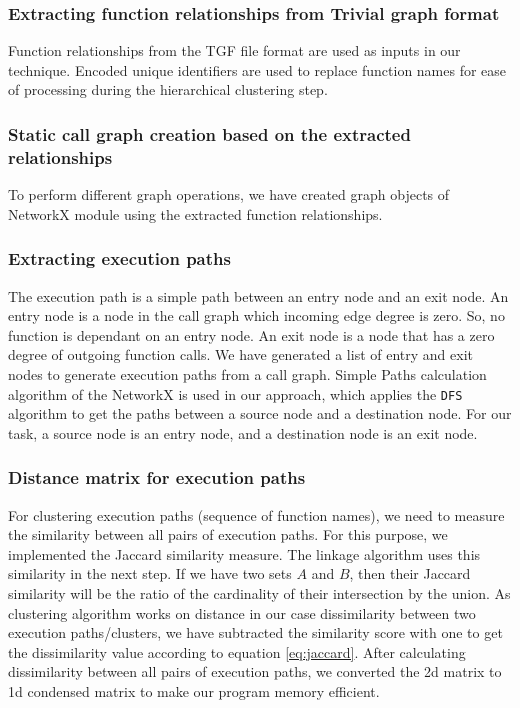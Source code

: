 \subsubsection{Extracting function relationships from Trivial graph format}

Function relationships from the TGF file format are used as inputs in our technique. Encoded unique identifiers are used to replace function names for ease of processing during the hierarchical clustering step.

\subsubsection{Static call graph creation based on the extracted relationships}
To perform different graph operations, we have created graph objects of NetworkX \cite{networkx} module using the extracted function relationships. 
\subsubsection{Extracting execution paths}

The execution path is a simple path between an entry node and an exit node. An entry node is a node in the call graph which incoming edge degree is zero. So, no function is dependant on an entry node. An exit node is a node that has a zero degree of outgoing function calls. We have generated a list of entry and exit nodes to generate execution paths from a call graph. Simple Paths calculation algorithm of the NetworkX \cite{networkx}  is used in our approach, which applies the \texttt{DFS} algorithm to get the paths between a source node and a destination node. For our task, a source node is an entry node, and a destination node is an exit node.    

\subsubsection{Distance matrix for execution paths}

For clustering execution paths (sequence of function names), we need to measure the similarity between all pairs of execution paths. For this purpose, we  \cite{niwattanakul2013jaccardKeywordsSimilarity} implemented the Jaccard similarity measure. The linkage algorithm uses this similarity in the next step. If we have two sets $A$ and $B$, then their Jaccard similarity will be the ratio of the cardinality of their intersection by the union. As clustering algorithm works on distance in our case dissimilarity between two execution paths/clusters, we have subtracted the similarity score with one to get the dissimilarity value according to equation \ref{eq:jaccard}. After calculating dissimilarity between all pairs of execution paths, we converted the 2d matrix to 1d condensed matrix to make our program memory efficient.

